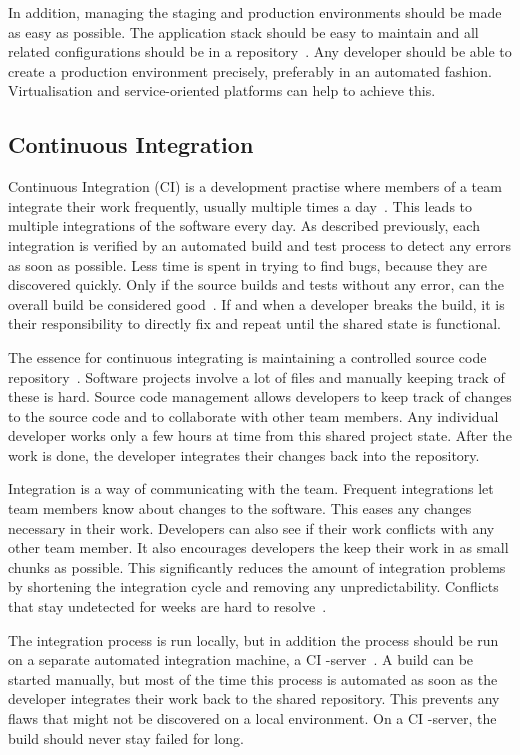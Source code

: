 \documentclass[english]{tktltiki2}
\begin{document}
In addition, managing the staging and production environments should be made as easy as possible. The application stack should be easy to maintain and all related configurations should be in a repository~\cite{HF11}. Any developer should be able to create a production environment precisely, preferably in an automated fashion. Virtualisation and service-oriented platforms can help to achieve this.

\subsection{Continuous Integration}

Continuous Integration (CI) is a development practise where members of a team integrate their work frequently, usually multiple times a day~\cite{Fow06}. This leads to multiple integrations of the software every day. As described previously, each integration is verified by an automated build and test process to detect any errors as soon as possible. Less time is spent in trying to find bugs, because they are discovered quickly. Only if the source builds and tests without any error, can the overall build be considered good~\cite{Fow06}. If and when a developer breaks the build, it is their responsibility to directly fix and repeat until the shared state is functional.

The essence for continuous integrating is maintaining a controlled source code repository~\cite{Fow06}. Software projects involve a lot of files and manually keeping track of these is hard. Source code management allows developers to keep track of changes to the source code and to collaborate with other team members. Any individual developer works only a few hours at time from this shared project state. After the work is done, the developer integrates their changes back into the repository.

Integration is a way of communicating with the team. Frequent integrations let team members know about changes to the software. This eases any changes necessary in their work. Developers can also see if their work conflicts with any other team member. It also encourages developers the keep their work in as small chunks as possible. This significantly reduces the amount of integration problems by shortening the integration cycle and removing any unpredictability. Conflicts that stay undetected for weeks are hard to resolve~\cite{Fow06}.

The integration process is run locally, but in addition the process should be run on a separate automated integration machine, a CI -server~\cite{Fow06}. A build can be started manually, but most of the time this process is automated as soon as the developer integrates their work back to the shared repository. This prevents any flaws that might not be discovered on a local environment. On a CI -server, the build should never stay failed for long.
\end{document}
